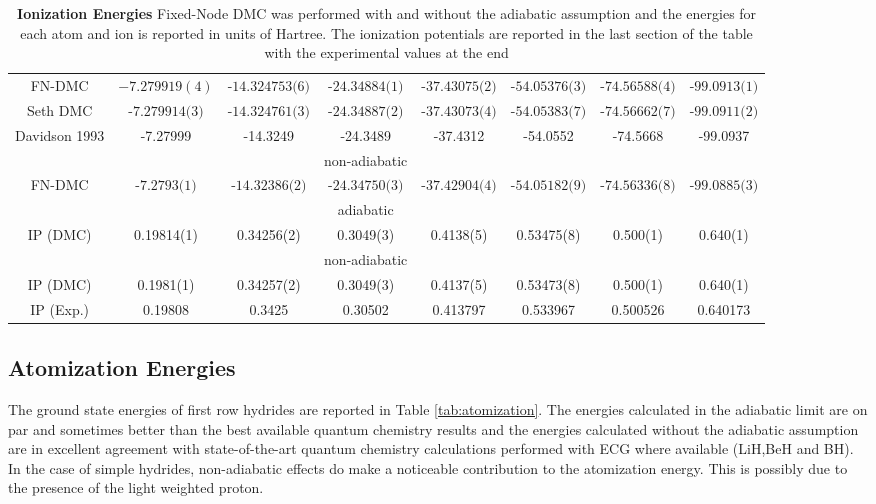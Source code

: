 \documentclass[aps,prl,superscriptaddress,groupedaddress]{revtex4}
\begin{document}
\begin{table*}[htpb!]
\begin{tabular}{*{1}{*{8}{c}}}
FN-DMC & $-7.279919(4)$ & $\text{-14.324753(6)}$ & $\text{-24.34884(1)}$ & $\text{-37.43075(2)}$ & $\text{-54.05376(3)}$ & $\text{-74.56588(4)}$ & $\text{-99.0913(1)}$ \\
Seth DMC \cite{Seth_Bench} & $\text{-7.279914(3)}$ & $\text{-14.324761(3)}$ & $\text{-24.34887(2)}$ & $\text{-37.43073(4)}$ & $\text{-54.05383(7)}$ & $\text{-74.56662(7)}$ & $\text{-99.0911(2)}$ \\
Davidson 1993 \footnotemark[1] \cite{Davidson_Atoms} & -7.27999 & -14.3249 & -24.3489 & -37.4312 & -54.0552 & -74.5668 & -99.0937 \\
&&&non-adiabatic&&&& \\
FN-DMC & $\text{-7.2793(1)}$ & $\text{-14.32386(2)}$ & $\text{-24.34750(3)}$ & $\text{-37.42904(4)}$ & $\text{-54.05182(9)}$ & $\text{-74.56336(8)}$ & $\text{-99.0885(3)}$ \\
\hline
&&&adiabatic&&&& \\
IP (DMC) & 0.19814(1) & 0.34256(2) & 0.3049(3) & 0.4138(5) & 0.53475(8) & 0.500(1) & 0.640(1) \\
&&&non-adiabatic&&&& \\
IP (DMC) & 0.1981(1) & 0.34257(2) & 0.3049(3) & 0.4137(5) & 0.53473(8) & 0.500(1) & 0.640(1) \\
IP (Exp.) \cite{Davidson_Atoms} & 0.19808 & 0.3425 & 0.30502 & 0.413797 & 0.533967 & 0.500526 & 0.640173 \\
\hline
\end{tabular}
\caption{\textbf{Ionization Energies} Fixed-Node DMC was performed with and without the adiabatic assumption and the energies for each atom and ion is reported in units of Hartree. The ionization potentials are reported in the last section of the table with the experimental values at the end \label{tab:ionization}}
\end{table*}
 
\subsection{Atomization Energies}
The ground state energies of first row hydrides are reported in Table \ref{tab:atomization}. The energies calculated in the adiabatic limit are on par and sometimes better than the best available quantum chemistry results \cite{Adamowicz_LiH,Koput_BeH,Miliordos_BH} and the energies calculated without the adiabatic assumption are in excellent agreement with state-of-the-art quantum chemistry calculations performed with ECG where available (LiH,BeH and BH). In the case of simple hydrides, non-adiabatic effects do make a noticeable contribution to the atomization energy. This is possibly due to the presence of the light weighted proton.
 
\end{document}
